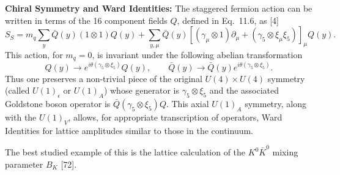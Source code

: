 \textbf{Chiral Symmetry and Ward Identities:} The staggered fermion action
can be written in terms of the 16 component fields $Q$, defined in Eq.~11.6,
as [4]
\begin{equation}
S_S = m_q\sum_y \bar{Q}(y)(1\otimes 1)Q(y)
+ \sum_{y,\mu}\bar{Q}(y)\left[(\gamma_\mu\otimes 1)\partial_\mu
+ (\gamma_5\otimes\xi_\mu\xi_5)\right]_\mu Q(y) .
\label{eq:sf-action-hypercube}
\end{equation}
This action, for $m_q = 0$, is invariant under the following abelian transformation
\begin{equation}
Q(y) \to e^{i\theta(\gamma_5\otimes\xi_5)}Q(y), \qquad
\bar{Q}(y) \to \bar{Q}(y)e^{i\theta(\gamma_5\otimes\xi_5)} .
\label{eq:sf-abelian}
\end{equation}
Thus one preserves a non-trivial piece of the original $U(4)\times U(4)$ symmetry
(called $U(1)_\epsilon$ or $U(1)_A$) whose generator is $\gamma_5\otimes\xi_5$ and the associated
Goldstone boson operator is $\bar{Q}(\gamma_5\otimes\xi_5)Q$. This axial $U(1)_A$ symmetry,
along with the $U(1)_V$, allows, for appropriate transcription of operators,
Ward Identities for lattice amplitudes similar to those in the continuum.

The best studied example of this is the lattice calculation of the $K^0\bar{K}^0$
mixing parameter $B_K$ [72].

